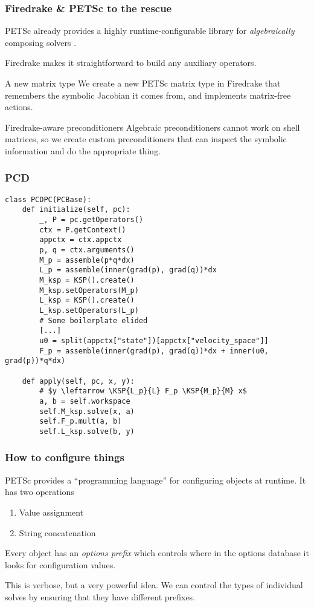 \documentclass[presentation]{beamer}
\newcommand{\KSP}[2]{\ensuremath{\mathcal{K}\left(#1, \mathbb{#2}\right)}}
\begin{document}
\begin{frame}[fragile]
  \frametitle{Firedrake \& PETSc to the rescue}
  PETSc already provides a highly runtime-configurable library for
  \emph{algebraically} composing solvers \parencite{Brown:2012}.

  Firedrake makes it straightforward to build any auxiliary
  operators.

  \begin{block}{A new matrix type}
    We create a new PETSc matrix type in Firedrake that remembers the
    symbolic Jacobian it comes from, and implements matrix-free
    actions.
  \end{block}
  \begin{block}{Firedrake-aware preconditioners}
    Algebraic preconditioners cannot work on shell matrices, so we
    create custom preconditioners that can inspect the symbolic
    information and do the appropriate thing.
  \end{block}
\end{frame}

\begin{frame}[fragile]
  \frametitle{PCD}

\begin{verbatim}
class PCDPC(PCBase):
    def initialize(self, pc):
        _, P = pc.getOperators()
        ctx = P.getContext()
        appctx = ctx.appctx
        p, q = ctx.arguments()
        M_p = assemble(p*q*dx)
        L_p = assemble(inner(grad(p), grad(q))*dx
        M_ksp = KSP().create()
        M_ksp.setOperators(M_p)
        L_ksp = KSP().create()
        L_ksp.setOperators(L_p)
        # Some boilerplate elided
        [...]
        u0 = split(appctx["state"])[appctx["velocity_space"]]
        F_p = assemble(inner(grad(p), grad(q))*dx + inner(u0, grad(p))*q*dx)

    def apply(self, pc, x, y):
        # $y \leftarrow \KSP{L_p}{L} F_p \KSP{M_p}{M} x$
        a, b = self.workspace
        self.M_ksp.solve(x, a)
        self.F_p.mult(a, b)
        self.L_ksp.solve(b, y)
\end{verbatim}
\end{frame}

\begin{frame}
  \frametitle{How to configure things}

  PETSc provides a ``programming language'' for configuring objects at
  runtime.  It has two operations

  \begin{enumerate}
  \item Value assignment
  \item String concatenation
  \end{enumerate}

  Every object has an \emph{options prefix} which controls where in
  the options database it looks for configuration values.

  This is verbose, but a very powerful idea.  We can control the types
  of individual solves by ensuring that they have different prefixes.
\end{frame}
\end{document}
